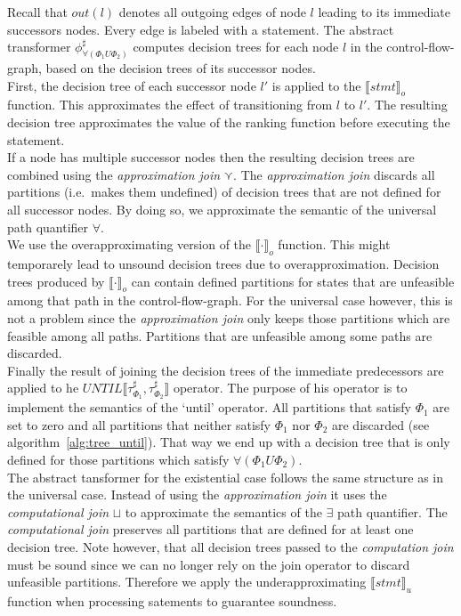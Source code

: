 \documentclass[11pt,a4paper,titlepage]{article}
\begin{document}
Recall that $out(l)$ denotes all outgoing edges of node $l$ leading to its immediate successors nodes. Every edge is labeled with a statement. 
The abstract transformer $\phi^\sharp_{\forall(\Phi_1 U \Phi_2)}$ computes decision trees for each node $l$ in the 
control-flow-graph, based on the decision trees of its successor nodes.\\

First, the decision tree of each successor node $l'$ is applied to the ${\llbracket stmt \rrbracket}_{o}$ function. 
This approximates the effect of transitioning from $l$ to $l'$. The resulting decision tree approximates the value of 
the ranking function before executing the statement.\\

If a node has multiple successor nodes then the resulting decision trees 
are combined using the \textit{approximation join} $\curlyvee$. The \textit{approximation join} discards all partitions (i.e.\ makes them undefined)
of decision trees that are not defined for all successor nodes. By doing so, we approximate the semantic of the universal path  
quantifier $\forall$.\\ 

We use the overapproximating version of the ${\llbracket \cdot \rrbracket}_{o}$ function. 
This might temporarely lead to unsound decision trees due to overapproximation. 
Decision trees produced by ${\llbracket \cdot \rrbracket}_{o}$ can contain defined partitions for states that are unfeasible 
among that path in the control-flow-graph. For the universal case however, this is not a problem since the 
\textit{approximation join} only keeps those partitions which are feasible among all paths. 
Partitions that are unfeasible among some paths are discarded.\\

Finally the result of joining the decision trees of the immediate predecessors are 
applied to he $UNTIL\llbracket \tau^\sharp_{\Phi_1}, \tau^\sharp_{\Phi_2} \rrbracket $ operator. 
The purpose of his operator is to implement the semantics of the `until' operator. 
All partitions that satisfy $\Phi_1$ are set to zero and all partitions that neither 
satisfy $\Phi_1$ nor $\Phi_2$ are discarded (see algorithm~\ref{alg:tree_until}).
That way we end up with a decision tree that is only defined for those partitions which satisfy $\forall(\Phi_1 U \Phi_2)$.\\


The abstract tansformer for the existential case follows the same structure as in the universal case. 
Instead of using the \textit{approximation join} it uses the \textit{computational join} $\sqcup$ 
to approximate the semantics of the $\exists$ path quantifier. 
The \textit{computational join} preserves all partitions that are defined for at least one decision tree. 
Note however, that all decision trees passed to the \textit{computation join} must be sound since we can no longer 
rely on the join operator to discard unfeasible partitions. Therefore we apply the underapproximating ${\llbracket stmt \rrbracket}_{u}$ 
function when processing satements to guarantee soundness.
\end{document}
